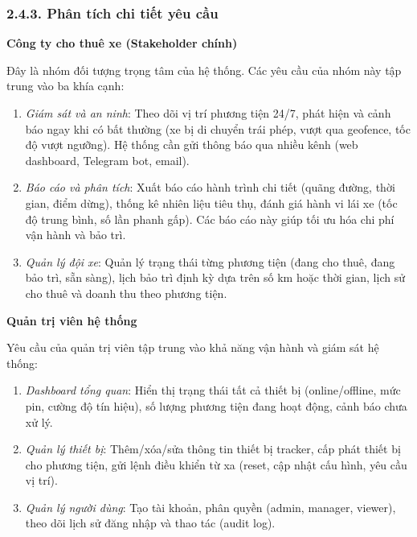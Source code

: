 \documentclass[13pt,a4paper]{extarticle}
\renewcommand{\\}{\thesislongtableorignewline\hline}%
\providecommand{\tightlist}{%
  \setlength{\itemsep}{0pt}\setlength{\parskip}{0pt}}
\begin{document}
\subsubsection{2.4.3. Phân tích chi tiết yêu
cầu}\label{243-phuxe2n-tuxedch-chi-tiux1ebft-yuxeau-cux1ea7u}

\textbf{Công ty cho thuê xe (Stakeholder chính)}

Đây là nhóm đối tượng trọng tâm của hệ thống. Các yêu cầu của nhóm này
tập trung vào ba khía cạnh:

\begin{enumerate}
\def\labelenumi{\arabic{enumi}.}
\tightlist
\item
  \emph{Giám sát và an ninh}: Theo dõi vị trí phương tiện 24/7, phát
  hiện và cảnh báo ngay khi có bất thường (xe bị di chuyển trái phép,
  vượt qua geofence, tốc độ vượt ngưỡng). Hệ thống cần gửi thông báo qua
  nhiều kênh (web dashboard, Telegram bot, email).
\item
  \emph{Báo cáo và phân tích}: Xuất báo cáo hành trình chi tiết (quãng
  đường, thời gian, điểm dừng), thống kê nhiên liệu tiêu thụ, đánh giá
  hành vi lái xe (tốc độ trung bình, số lần phanh gấp). Các báo cáo này
  giúp tối ưu hóa chi phí vận hành và bảo trì.
\item
  \emph{Quản lý đội xe}: Quản lý trạng thái từng phương tiện (đang cho
  thuê, đang bảo trì, sẵn sàng), lịch bảo trì định kỳ dựa trên số km
  hoặc thời gian, lịch sử cho thuê và doanh thu theo phương tiện.
\end{enumerate}

\textbf{Quản trị viên hệ thống}

Yêu cầu của quản trị viên tập trung vào khả năng vận hành và giám sát hệ
thống:

\begin{enumerate}
\def\labelenumi{\arabic{enumi}.}
\tightlist
\item
  \emph{Dashboard tổng quan}: Hiển thị trạng thái tất cả thiết bị
  (online/offline, mức pin, cường độ tín hiệu), số lượng phương tiện
  đang hoạt động, cảnh báo chưa xử lý.
\item
  \emph{Quản lý thiết bị}: Thêm/xóa/sửa thông tin thiết bị tracker, cấp
  phát thiết bị cho phương tiện, gửi lệnh điều khiển từ xa (reset, cập
  nhật cấu hình, yêu cầu vị trí).
\item
  \emph{Quản lý người dùng}: Tạo tài khoản, phân quyền (admin, manager,
  viewer), theo dõi lịch sử đăng nhập và thao tác (audit log).
\end{enumerate}
\end{document}
